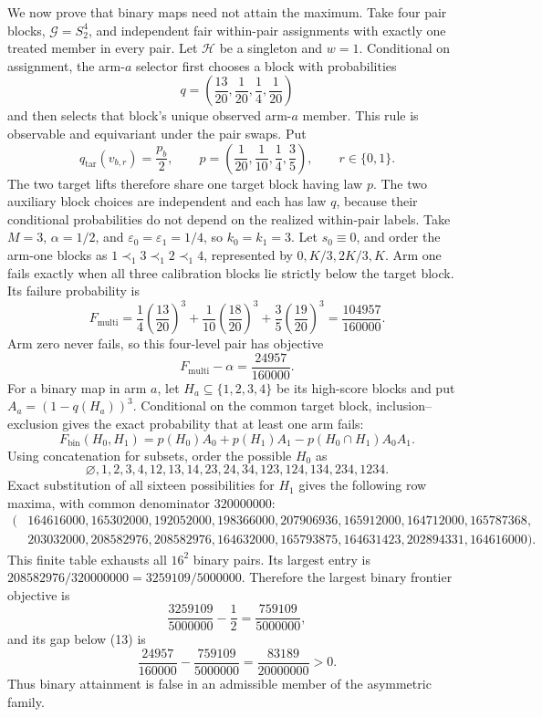 We now prove that binary maps need not attain the maximum. Take four pair blocks, \(\mathcal G=S_2^4\), and independent fair within-pair assignments with exactly one treated member in every pair. Let \(\mathcal H\) be a singleton and \(w=1\). Conditional on assignment, the arm-\(a\) selector first chooses a block with probabilities
\[
q=\left(\frac{13}{20},\frac1{20},\frac14,\frac1{20}\right)
\tag{10}
\]
and then selects that block's unique observed arm-\(a\) member. This rule is observable and equivariant under the pair swaps. Put
\[
q_{\mathrm{tar}}(v_{b,r})=\frac{p_b}{2},
\qquad
p=\left(\frac1{20},\frac1{10},\frac14,\frac35\right),
\qquad r\in\{0,1\}.
\tag{11}
\]
The two target lifts therefore share one target block having law \(p\). The two auxiliary block choices are independent and each has law \(q\), because their conditional probabilities do not depend on the realized within-pair labels. Take \(M=3\), \(\alpha=1/2\), and \(\varepsilon_0=\varepsilon_1=1/4\), so \(k_0=k_1=3\). Let \(s_0\equiv0\), and order the arm-one blocks as \(1\prec_1 3\prec_1 2\prec_1 4\), represented by \(0,K/3,2K/3,K\). Arm one fails exactly when all three calibration blocks lie strictly below the target block. Its failure probability is
\[
F_{\mathrm{multi}}=\frac14\left(\frac{13}{20}\right)^3+\frac1{10}\left(\frac{18}{20}\right)^3+\frac35\left(\frac{19}{20}\right)^3=\frac{104957}{160000}.
\tag{12}
\]
Arm zero never fails, so this four-level pair has objective
\[
F_{\mathrm{multi}}-\alpha=\frac{24957}{160000}.
\tag{13}
\]
For a binary map in arm \(a\), let \(H_a\subseteq\{1,2,3,4\}\) be its high-score blocks and put \(A_a=(1-q(H_a))^3\). Conditional on the common target block, inclusion--exclusion gives the exact probability that at least one arm fails:
\[
F_{\mathrm{bin}}(H_0,H_1)=p(H_0)A_0+p(H_1)A_1-p(H_0\cap H_1)A_0A_1.
\tag{14}
\]
Using concatenation for subsets, order the possible \(H_0\) as
\[
\varnothing,1,2,3,4,12,13,14,23,24,34,123,124,134,234,1234.
\]
Exact substitution of all sixteen possibilities for \(H_1\) gives the following row maxima, with common denominator \(320000000\):
\[
\begin{split}
(&164616000,165302000,192052000,198366000,207906936,165912000,164712000,165787368,\\
&203032000,208582976,208582976,164632000,165793875,164631423,202894331,164616000).
\end{split}
\tag{15}
\]
This finite table exhausts all \(16^2\) binary pairs. Its largest entry is \(208582976/320000000=3259109/5000000\). Therefore the largest binary frontier objective is
\[
\frac{3259109}{5000000}-\frac12=\frac{759109}{5000000},
\]
and its gap below (13) is
\[
\frac{24957}{160000}-\frac{759109}{5000000}=\frac{83189}{20000000}>0.
\tag{16}
\]
Thus binary attainment is false in an admissible member of the asymmetric family.

